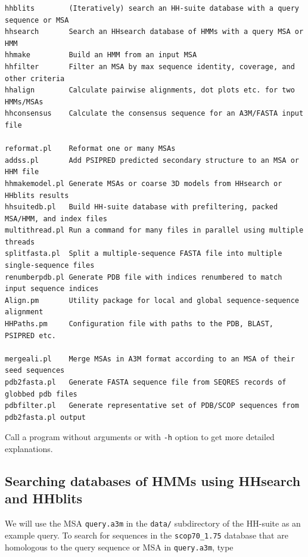 \documentclass[11pt,a4paper]{article}
\begin{document}
\small 
\begin{verbatim}
hhblits        (Iteratively) search an HH-suite database with a query sequence or MSA
hhsearch       Search an HHsearch database of HMMs with a query MSA or HMM
hhmake         Build an HMM from an input MSA 
hhfilter       Filter an MSA by max sequence identity, coverage, and other criteria
hhalign        Calculate pairwise alignments, dot plots etc. for two HMMs/MSAs
hhconsensus    Calculate the consensus sequence for an A3M/FASTA input file

reformat.pl    Reformat one or many MSAs
addss.pl       Add PSIPRED predicted secondary structure to an MSA or HHM file
hhmakemodel.pl Generate MSAs or coarse 3D models from HHsearch or HHblits results	
hhsuitedb.pl   Build HH-suite database with prefiltering, packed MSA/HMM, and index files
multithread.pl Run a command for many files in parallel using multiple threads
splitfasta.pl  Split a multiple-sequence FASTA file into multiple single-sequence files
renumberpdb.pl Generate PDB file with indices renumbered to match input sequence indices
Align.pm       Utility package for local and global sequence-sequence alignment
HHPaths.pm     Configuration file with paths to the PDB, BLAST, PSIPRED etc.

mergeali.pl    Merge MSAs in A3M format according to an MSA of their seed sequences
pdb2fasta.pl   Generate FASTA sequence file from SEQRES records of globbed pdb files
pdbfilter.pl   Generate representative set of PDB/SCOP sequences from pdb2fasta.pl output
\end{verbatim} 
\normalsize


Call a program without arguments or with \verb`-h` option to get more detailed explanations.


\subsection{Searching databases of HMMs using HHsearch and HHblits}\label{searching_hm_dbs}

We will use the MSA \verb`query.a3m` in the \verb`data/` subdirectory of the HH-suite as an example query. To search for sequences in the \verb`scop70_1.75` database that are homologous to the query sequence or MSA in \verb`query.a3m`, type
\end{document}
